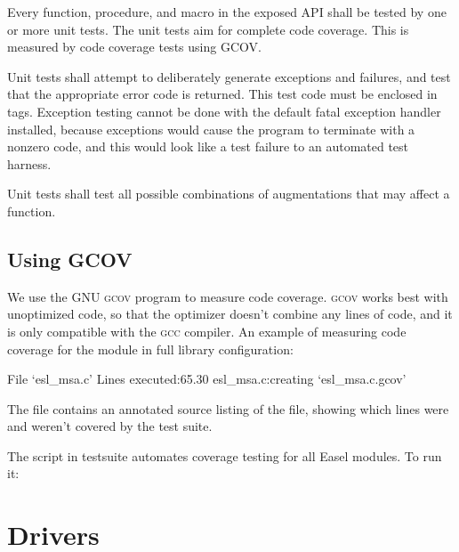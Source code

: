 Every function, procedure, and macro in the exposed API shall be
tested by one or more unit tests. The unit tests aim for complete code
coverage. This is measured by code coverage tests using GCOV.

Unit tests shall attempt to deliberately generate exceptions and
failures, and test that the appropriate error code is returned.  This
test code must be enclosed in  tags.
Exception testing cannot be done with the default fatal exception
handler installed, because exceptions would cause the program to
terminate with a nonzero code, and this would look like a test failure
to an automated test harness.

Unit tests shall test all possible combinations of augmentations that
may affect a function.

\subsection{Using GCOV} 

We use the GNU \textsc{gcov} program to measure code
coverage. \textsc{gcov} works best with unoptimized code, so that the
optimizer doesn't combine any lines of code, and it is only compatible
with the \textsc{gcc} compiler. An example of measuring code coverage
for the  module in full library configuration:

\begin{cchunk}
  File `esl_msa.c'
  Lines executed:65.30%
  esl_msa.c:creating `esl_msa.c.gcov'
\end{cchunk}

The file  contains an annotated source listing
of the  file, showing which lines were and weren't covered
by the test suite.

The  script in testsuite automates coverage
testing for all Easel modules. To run it:

\begin{cchunk} 
\end{cchunk}



\section{Drivers}

